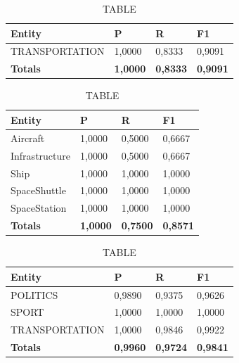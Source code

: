 \documentclass[thesis=M,english]{FITthesis}[2018/05/30]
\begin{document}
	\begin{table}[H]\centering
		\caption{TABLE}
		\label{}
		\begin{tabular}{|l|l|l|l|}
			\hline {\textbf{Entity}} & {\textbf{P}} & {\textbf{R}} & {\textbf{F1}}\\\hline
				TRANSPORTATION & 1,0000 & 0,8333 & 0,9091\\\hline
				\textbf{Totals} & \textbf{1,0000} & \textbf{0,8333} & \textbf{0,9091}\\\hline
		\end{tabular}
	\end{table}	
	
	\begin{table}[H]\centering
		\caption{TABLE}
		\label{}
		\begin{tabular}{|l|l|l|l|}
			\hline {\textbf{Entity}} & {\textbf{P}} & {\textbf{R}} & {\textbf{F1}}\\\hline
				Aircraft & 1,0000 & 0,5000 & 0,6667\\
				Infrastructure & 1,0000 & 0,5000 & 0,6667\\
				Ship & 1,0000 & 1,0000 & 1,0000\\				
				SpaceShuttle & 1,0000 & 1,0000 & 1,0000\\
				SpaceStation & 1,0000 & 1,0000 & 1,0000\\\hline
				\textbf{Totals} & \textbf{1,0000} & \textbf{0,7500} & \textbf{0,8571}\\\hline
		\end{tabular}
	\end{table}
	
	

	
	\begin{table}[H]\centering
		\caption{TABLE}
		\label{}
		\begin{tabular}{|l|l|l|l|}
			\hline {\textbf{Entity}} & {\textbf{P}} & {\textbf{R}} & {\textbf{F1}}\\\hline
				POLITICS & 0,9890 & 0,9375 & 0,9626\\
				SPORT & 1,0000 & 1,0000 & 1,0000\\
				TRANSPORTATION & 1,0000 & 0,9846 & 0,9922\\\hline
				\textbf{Totals} & \textbf{0,9960} & \textbf{0,9724} & \textbf{0,9841}\\\hline
		\end{tabular}
	\end{table}
\end{document}

